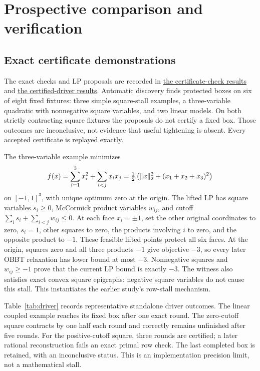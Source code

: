 \section{Prospective comparison and verification}\label{sec:evidence}

\subsection{Exact certificate demonstrations}

The exact checks and LP proposals are recorded in
\href{run:../theory/remaining-benefit-checks.json}{the certificate-check results}
and
\href{run:../theory/remaining-benefit-driver-checks.json}{the certified-driver results}.
Automatic discovery finds protected boxes on six of eight fixed
fixtures: three simple square-stall examples, a three-variable quadratic
with nonnegative square variables, and two linear models. On both
strictly contracting square fixtures the proposals do not certify a
fixed box. Those outcomes are inconclusive, not evidence that useful
tightening is absent. Every accepted certificate is replayed exactly.

The three-variable example minimizes
\[
 f(x)=\sum_{i=1}^3x_i^2+\sum_{i<j}x_ix_j
     =\tfrac12\left(\lVert x\rVert_2^2+(x_1+x_2+x_3)^2\right)
\]
on $[-1,1]^3$, with unique optimum zero at the origin. The lifted LP
has square variables $s_i\ge0$, McCormick product variables $w_{ij}$,
and cutoff $\sum_i s_i+\sum_{i<j}w_{ij}\le0$.
At each face $x_i=\pm1$, set the other original coordinates to zero,
$s_i=1$, other squares to zero, the products involving $i$ to zero,
and the opposite product to $-1$. These feasible lifted points protect
all six faces. At the origin, squares zero and all three products $-1$
give objective $-3$, so every later OBBT relaxation has lower bound
at most $-3$. Nonnegative squares and $w_{ij}\ge-1$ prove that the
current LP bound is exactly $-3$. The witness also satisfies exact
convex square epigraphs: negative square variables do not cause this
stall. This instantiates the earlier study's row-stall mechanism.

Table~\ref{tab:driver} records representative standalone driver outcomes.
The linear coupled example reaches its fixed box after one exact round.
The zero-cutoff square contracts by one half each round and correctly
remains unfinished after five rounds. For the positive-cutoff square,
three rounds are certified; a later rational reconstruction fails an
exact primal row check. The last completed box is retained, with an
inconclusive status. This is an implementation precision limit, not a
mathematical stall.

